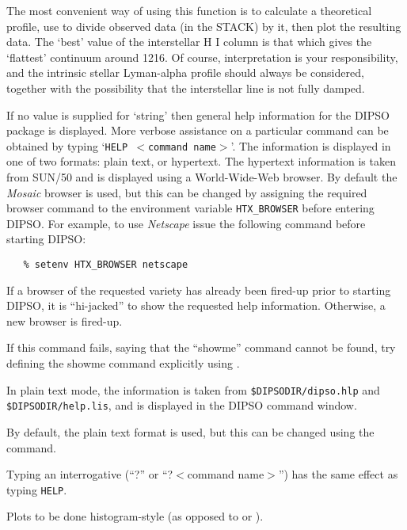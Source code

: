 \begin {description}
The most convenient way of using this function is to calculate a
theoretical profile, use   to divide observed data (in the STACK)
by it, then plot the resulting data. The `best' value of the
interstellar H I column is that which gives the `flattest' continuum
around 1216. Of course, interpretation is your responsibility, and the
intrinsic stellar Lyman-alpha profile should always be considered,
together with the possibility that the interstellar line is not fully
damped.

If no value is supplied for `string' then general help information for
the DIPSO package is displayed. More verbose assistance on a particular
command can be obtained by typing `{\tt{HELP} $<$command name$>$}'. The
information is displayed in one of two formats: plain text, or hypertext.
The hypertext information is taken from SUN/50 and is displayed using a
World-Wide-Web browser. By default the {\em Mosaic} browser is used, but
this can be changed by assigning the required browser command to the
environment variable {\tt HTX\_BROWSER} before entering DIPSO. For
example, to use {\em Netscape} issue the following command before
starting DIPSO:

\begin{verbatim}
   % setenv HTX_BROWSER netscape
\end{verbatim}

If a browser of the requested variety has already been fired-up prior to
starting DIPSO, it is ``hi-jacked'' to show the requested help
information. Otherwise, a new browser is fired-up.

If this command fails, saying that the ``showme'' command cannot be found, 
try defining the showme command explicitly using
.

In plain text mode, the information is taken from
{\tt{\$DIPSODIR/dipso.hlp}} and {\tt{\$DIPSODIR/help.lis}}, and is
displayed in the DIPSO command window.

By default, the plain text format is used, but this can be changed using the
 command. 

Typing an interrogative (``?'' or ``?$<$command name$>$'') has the same effect 
as typing {\tt{HELP}}.

Plots to be done histogram-style (as opposed to   or ). 



\end{description}
